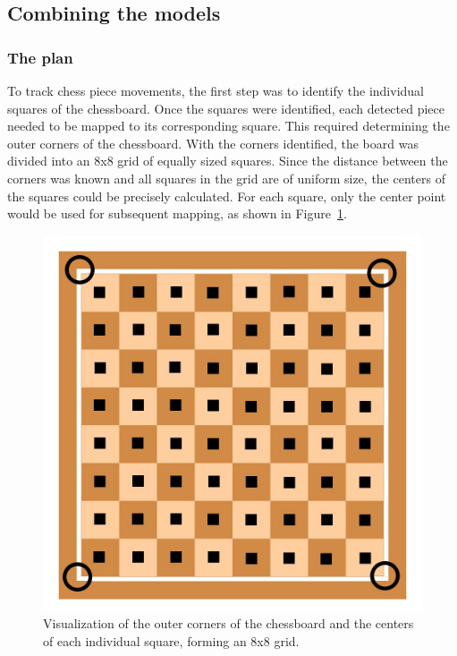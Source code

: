 \newpage


\subsection{Combining the models}

\subsubsection*{The plan}

To track chess piece movements, the first step was to identify the individual squares of the chessboard. Once the squares were identified, each detected piece needed to be mapped to its corresponding square. This required determining the outer corners of the chessboard. With the corners identified, the board was divided into an 8x8 grid of equally sized squares. Since the distance between the corners was known and all squares in the grid are of uniform size, the centers of the squares could be precisely calculated. For each square, only the center point would be used for subsequent mapping, as shown in Figure~\ref{fig:chessboard-centers}.



\begin{figure}[h!]
    \centering
    \includegraphics[width=0.75\linewidth]{figures/methods/ml-models/outer_corners_centers_chessboard.jpg}
    \caption[S]{Visualization of the outer corners of the chessboard and the centers of each individual square, forming an 8x8 grid. \cite{vectorstock:chessboard-svg}}
    \label{fig:chessboard-centers}
\end{figure}


